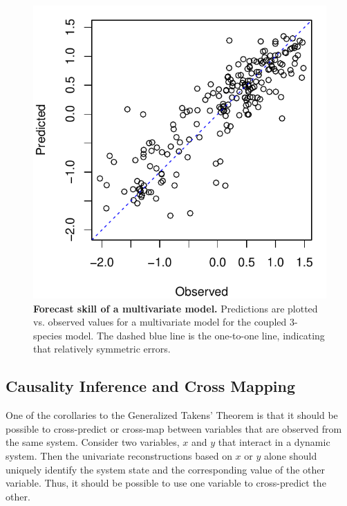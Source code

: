\begin{figure}[!ht]
\begin{center}\includegraphics[width=\maxwidth{\textwidth}]{fig_redm_6.pdf}\end{center}
\caption[Forecast skill of a multivariate model.]{\textbf{Forecast skill of a multivariate model.}\newline
Predictions are plotted vs. observed values for a multivariate model for the coupled 3-species model. The dashed blue line is the one-to-one line, indicating that relatively symmetric errors.}
\end{figure}

\subsection{Causality Inference and Cross Mapping}

One of the corollaries to the Generalized Takens' Theorem is that it should be possible to cross-predict or cross-map between variables that are observed from the same system. Consider two variables, $x$ and $y$ that interact in a dynamic system. Then the univariate reconstructions based on $x$ or $y$ alone should uniquely identify the system state and the corresponding value of the other variable. Thus, it should be possible to use one variable to cross-predict the other.

